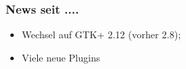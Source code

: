 \begin{frame}
	\frametitle{News seit ....}
	\begin{block}{}
		\begin{itemize}
			\item Wechsel auf GTK+ 2.12 (vorher 2.8);
			\item Viele neue Plugins
		\end{itemize}
	\end{block}
\end{frame}
